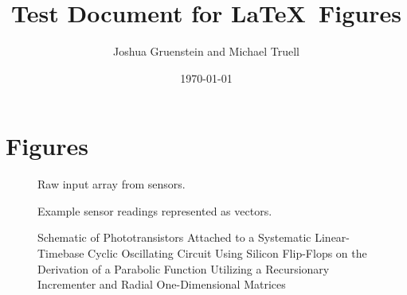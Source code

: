 \documentclass[a4paper]{article}
\title{Test Document for \LaTeX \ Figures}
\author{Joshua Gruenstein and Michael Truell}
\date{\today}
\begin{document}
\maketitle

\section{Figures}

\begin{figure} [h]
	\centering
	
	\caption{Raw input array from sensors.}
\end{figure}

\begin{figure} [h]
	\centering
	
	\caption{Example sensor readings represented as vectors.}
\end{figure}

\begin{figure} [h]
	\centering
	
	\caption{Schematic of Phototransistors Attached to a Systematic Linear-Timebase Cyclic Oscillating Circuit Using Silicon Flip-Flops on the Derivation of a Parabolic Function Utilizing a Recursionary Incrementer and Radial One-Dimensional Matrices}
\end{figure}
\end{document}
